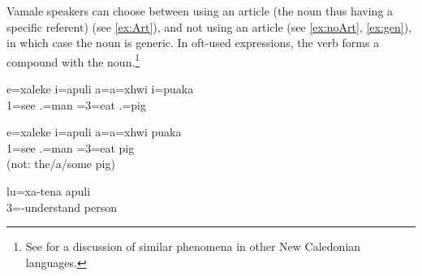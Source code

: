 Vamale speakers can choose between using an article (the noun thus having a specific referent) (see \ref{ex:Art}), and not using an article (see \ref{ex:noArt}, \ref{ex:gen}), in which case the noun is generic. In oft-used expressions, the verb forms a compound with the noun.\footnote{See \textcite{ozanne-rivierre_verbal_2004} for a discussion of similar phenomena in other New Caledonian languages.}


\ea\label{ex:Art}
\gll e=xaleke i=apuli a=a=xhwi i=puaka\\
	1=see .=man	=3=eat	 .=pig\\
\glt	{}
\z

\ea\label{ex:noArt}
\gll		e=xaleke i=apuli 	a=a=xhwi puaka\\
		1=see .=man 	=3=eat pig\\
\glt		{} (not: the/a/some pig)
		\z

%
%

\ea\label{ex:gen}
\gll lu=xa-tena apuli\\
 3=-understand person\\
\glt {}
\z



